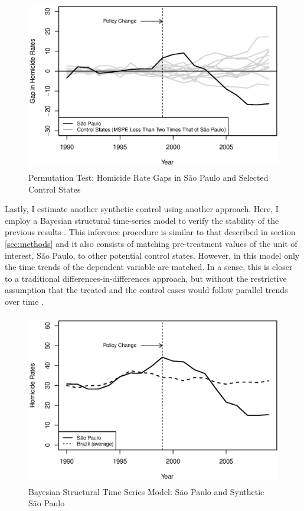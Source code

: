 \begin{figure}[H]
    \centering
    \includegraphics[height=7.5cm]{images/low-mspe.eps}
    \caption{Permutation Test: Homicide Rate Gaps in São Paulo and Selected Control States}
    \label{fig:figure7}
\end{figure}

Lastly, I estimate another synthetic control using another approach. Here, I employ a Bayesian structural time-series model to verify the stability of the previous results \citep{brodersen2015inferring}. This inference procedure is similar to that described in section \ref{sec:methods} and it also consists of matching pre-treatment values of the unit of interest, São Paulo, to other potential control states. However, in this model only the time trends of the dependent variable are matched. In a sense, this is closer to a traditional differences-in-differences approach, but without the restrictive assumption that the treated and the control cases would follow parallel trends over time \citep[p. 494]{abadie2010}.  

\begin{figure}[H]
    \centering
    \includegraphics[height=7.5cm]{images/causal-impact.eps}
    \caption{Bayesian Structural Time Series Model: São Paulo and Synthetic São Paulo}
    \label{fig:figure8}
\end{figure}

